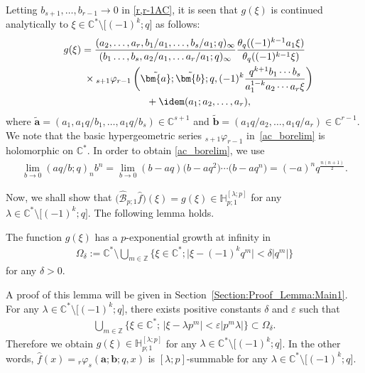 Letting $b_{s+1},\ldots,b_{r-1}\to 0$ in \eqref{r,r-1AC}, it is seen that $g(\xi)$ is continued analytically to $\xi\in\mathbb{C}^*\setminus\big[(-1)^{k};q\big]$ as follows:
\begin{gather}
g(\xi)=\frac{(a_2,\ldots,a_r,b_1/a_1,\ldots,b_{s}/a_1;q)_\infty}{(b_1\ldots,b_s,a_2/a_1,\ldots a_r/a_1;q)_\infty}\frac{\theta_q((-1)^{k-1}a_1\xi)}{\theta_q((-1)^{k-1}\xi)}\nonumber\\
\hphantom{g(\xi)=}{} \times{}_{s+1}\varphi_{r-1}\left(\tilde{\bm{a}};\tilde{\bm{b}};q,(-1)^k\frac{q^{k+1}b_1\cdots b_s}{a_1^{1-k}a_2\cdots a_r\xi}\right)\nonumber\\
\hphantom{g(\xi)=}{} +\idem(a_1;a_2,\ldots,a_r),\label{ac_borelim}
\end{gather}
where $\tilde{\bm{a}}=(a_1,a_1q/b_1,\ldots,a_1q/b_s)\in\mathbb{C}^{s+1}$ and $\tilde{\bm{b}}=(a_1q/a_2,\ldots,a_1q/a_r)\in\mathbb{C}^{r-1}$. We note that the basic hypergeometric series ${}_{s+1}\varphi_{r-1}$ in~\eqref{ac_borelim} is holomorphic on $\mathbb{C}^*$. In order to obtain \eqref{ac_borelim}, we use
\begin{gather*}
\lim_{b\to0}(aq/b;q)_nb^n=\lim_{b\to0}(b-aq)\big(b-aq^2\big)\cdots\big(b-aq^n\big)=(-a)^nq^{\frac{n(n+1)}{2}}.
\end{gather*}

Now, we shall show that $\big(\hat{\mathcal{B}}_{p;1}\hat{f}\big)(\xi)=g(\xi)\in\mathbb{H}_{p;1}^{[\lambda;p]}$ for any $\lambda\in\mathbb{C}^*\setminus\big[(-1)^k;q\big]$. The following lemma holds.
\begin{Lemma}\label{Lemma:Main1}
The function $g(\xi)$ has a $p$-exponential growth at infinity in
\begin{gather*}
\Omega_\delta:=\mathbb{C}^*\setminus\bigcup_{m\in\mathbb{Z}}\big\{\xi\in\mathbb{C}^* ;\big\vert\xi-(-1)^{k}q^m\vert<\delta\big\vert q^m\vert\big\}
\end{gather*}
for any $\delta>0$.
\end{Lemma}
A proof of this lemma will be given in Section~\ref{Section:Proof_Lemma:Main1}. For any $\lambda\in\mathbb{C}^*\setminus\big[(-1)^k;q\big]$, there exists positive constants $\delta$ and $\varepsilon$ such that
\begin{gather*}
\bigcup_{m\in\mathbb{Z}}\big\{\xi\in\mathbb{C}^* ;\,\vert\xi-\lambda p^m\vert<\varepsilon\vert p^m\lambda\vert\big\}\subset\Omega_\delta.
\end{gather*}
Therefore we obtain $g(\xi)\in\mathbb{H}_{p;1}^{[\lambda;p]}$ for any $\lambda\in\mathbb{C}^*\setminus\big[(-1)^k;q\big]$. In the other words, $\hat{f}(x)={}_r\varphi_s(\bm{a};\bm{b};q,x)$ is $[\lambda;p]$-summable for any $\lambda\in\mathbb{C}^*\setminus\big[(-1)^k;q\big]$.

